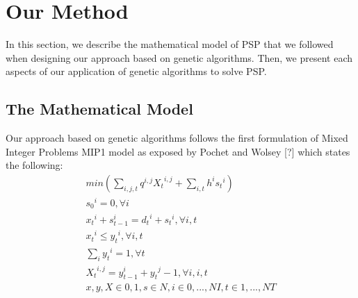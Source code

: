 \documentclass[twocolumn,10pt]{asme2ej}
\begin{document}
\section{Our Method}
In this section, we describe the mathematical model of PSP that we followed when designing our approach based on genetic algorithms. Then, we present each aspects of our application of genetic algorithms to solve PSP.

\subsection{The Mathematical Model}

Our approach based on genetic algorithms follows the first formulation of Mixed Integer Problems MIP1 model as exposed by Pochet and Wolsey [?] which states the following: 
\begin{gather}
    min (\sum_{i,j,t} q^{i,j} {X_t}^{i,j} + \sum_{i,t} h^{i} {s_t}^{i}) \\
    {s_0}^{i} = 0, \forall i \\
    {x_t}^{i} + {s_{t-1}^{i}} = {d_t}^i + {s_t}^i, \forall  i,t \\
    {x_t}^i \leq {y_t}^i, \forall  i,t \\
    \sum_{i} {y_t}^i = 1, \forall t \\
    {X_t}^{i,j} = {y_{t-1}^i} + {y_t}^j - 1, \forall i, i, t \\
    x,y,X \in {0,1}, s \in N, i \in {0,...,NI}, t \in {1,...,NT}
\end{gather}
\end{document}

